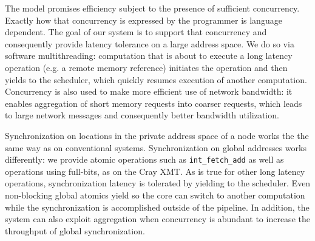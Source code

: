 \documentclass[10pt,nocopyrightspace,preprint]{sigplanconf}
\begin{document}


The model promises efficiency subject to the presence of sufficient
concurrency.  Exactly how that concurrency is expressed by the
programmer is language dependent. The goal of our system is to support
that concurrency and consequently provide latency tolerance on a large
address space. We do so via software multithreading: computation that
is about to execute a long latency operation (e.g. a remote memory
reference) initiates the operation and then yields to the scheduler,
which quickly resumes execution of another computation. Concurrency is
also used to make more efficient use of network bandwidth: it
enables aggregation of short memory requests into coarser requests,
which leads to large network messages and consequently better
bandwidth utilization.


Synchronization on locations in the private address space of a node
works the the same way as on conventional systems.  Synchronization on
global addresses works differently: we provide atomic operations such
as {\tt int\_fetch\_add} as well as operations using full-bits, as on
the Cray XMT.  As is true for other long latency operations,
synchronization latency is tolerated by yielding to the scheduler.
Even non-blocking global atomics yield so the core can switch to
another computation while the synchronization is accomplished outside
of the pipeline.  In addition, the system can also exploit aggregation
when concurrency is abundant to increase the throughput of global
synchronization.
\end{document}
